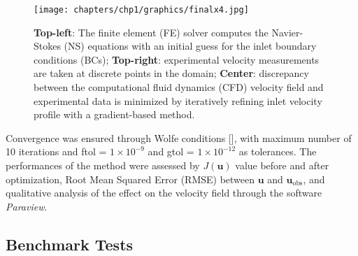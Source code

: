 \begin{figure}
    \centering
    \texttt{[image: chapters/chp1/graphics/finalx4.jpg]}
    \caption{\small \textbf{Top-left}: The finite element (FE) solver computes the Navier-Stokes (NS) equations with an initial guess for the inlet boundary conditions (BCs); \textbf{Top-right}: experimental velocity measurements are taken at discrete points in the domain; \textbf{Center}: discrepancy between the computational fluid dynamics (CFD) velocity field and experimental data is minimized by iteratively refining inlet velocity profile with a gradient-based method.}
    \label{fig:scheme}
\end{figure}

Convergence was ensured through Wolfe conditions [\cite{Nocedal2006}], with maximum number of 10 iterations and ftol = $1 \times 10^{-9}$ and gtol = $1 \times 10^{-12}$ as tolerances.
The performances of the method were assessed by $J(\textbf{u})$ value before and after optimization, Root Mean Squared Error (RMSE) between \( \mathbf{u}\) and \( \mathbf{u}_{\text{obs}} \), and qualitative analysis of the effect on the velocity field through the software \emph{Paraview}.

\subsection*{Benchmark Tests}

